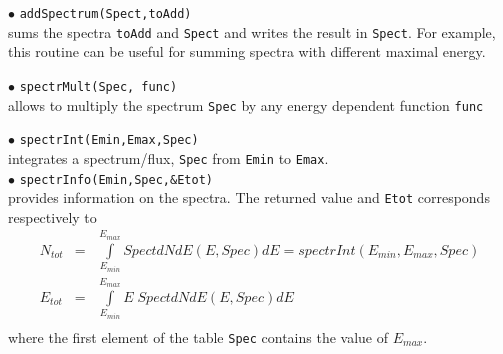 \documentclass[12pt,a4paper]{article}
\begin{document}
\noindent
$\bullet$ \verb|addSpectrum(Spect,toAdd)|\\
sums the  spectra \verb|toAdd|  and \verb|Spect| and writes the result in \verb|Spect|. For example, this routine can be useful for summing spectra 
with different  maximal energy.


\noindent
$\bullet$ \verb|spectrMult(Spec, func)|\\
allows to multiply the spectrum \verb|Spec| by any energy dependent function \verb|func|

\noindent
$\bullet$ \verb|spectrInt(Emin,Emax,Spec) | \\
integrates a spectrum/flux, \verb|Spec| from {\tt Emin} to  {\tt Emax}.\\
\noindent
$\bullet$ \verb|spectrInfo(Emin,Spec,&Etot)|\\
provides information on the spectra. The  returned value and \verb|Etot| corresponds respectively to   
\begin{eqnarray}
\nonumber
  N_{tot}&=&\int \limits_{E_{min}}^{E_{max}} SpectdNdE(E,Spec) dE = spectrInt(E_{min},E_{max},Spec) \\ 
\nonumber
  E_{tot}&=&  \int \limits_{E_{min}}^{E_{max}} E\; SpectdNdE(E,Spec)dE\\
\nonumber
 \end{eqnarray}
where the first element of the table {\tt Spec} contains the value of   $E_{max}$.
\end{document}
